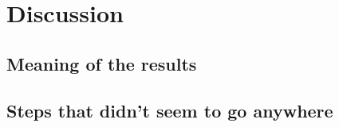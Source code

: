 \chapter{Discussion}

\section{Meaning of the results}

\section{Steps that didn't seem to go anywhere}